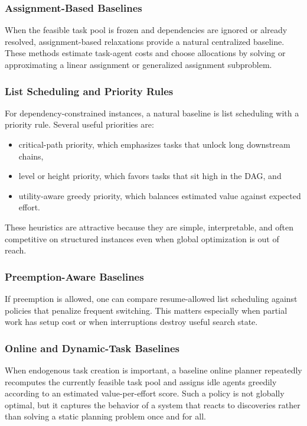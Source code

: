 \subsubsection{Assignment-Based Baselines}

When the feasible task pool is frozen and dependencies are ignored or already resolved, assignment-based relaxations provide a natural centralized baseline. These methods estimate task-agent costs and choose allocations by solving or approximating a linear assignment or generalized assignment subproblem.

\subsubsection{List Scheduling and Priority Rules}

For dependency-constrained instances, a natural baseline is list scheduling with a priority rule. Several useful priorities are:
\begin{itemize}
\item critical-path priority, which emphasizes tasks that unlock long downstream chains,
\item level or height priority, which favors tasks that sit high in the DAG, and
\item utility-aware greedy priority, which balances estimated value against expected effort.
\end{itemize}
These heuristics are attractive because they are simple, interpretable, and often competitive on structured instances even when global optimization is out of reach.

\subsubsection{Preemption-Aware Baselines}

If preemption is allowed, one can compare resume-allowed list scheduling against policies that penalize frequent switching. This matters especially when partial work has setup cost or when interruptions destroy useful search state.

\subsubsection{Online and Dynamic-Task Baselines}

When endogenous task creation is important, a baseline online planner repeatedly recomputes the currently feasible task pool and assigns idle agents greedily according to an estimated value-per-effort score. Such a policy is not globally optimal, but it captures the behavior of a system that reacts to discoveries rather than solving a static planning problem once and for all.

